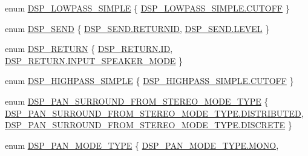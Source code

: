 \begin{DoxyCompactItemize}
enum \hyperlink{namespace_f_m_o_d_a346ac03fcdd5177ad38c9478df89c0dd}{D\+S\+P\+\_\+\+L\+O\+W\+P\+A\+S\+S\+\_\+\+S\+I\+M\+P\+LE} \{ \hyperlink{namespace_f_m_o_d_a346ac03fcdd5177ad38c9478df89c0dda87a6aa3278f5d7f6eadfdb8f66227a63}{D\+S\+P\+\_\+\+L\+O\+W\+P\+A\+S\+S\+\_\+\+S\+I\+M\+P\+L\+E.\+C\+U\+T\+O\+FF}
 \}
\item 
enum \hyperlink{namespace_f_m_o_d_a0d77bcf4c6e748a51c3ccfc32dee3200}{D\+S\+P\+\_\+\+S\+E\+ND} \{ \hyperlink{namespace_f_m_o_d_a0d77bcf4c6e748a51c3ccfc32dee3200adc385900d77d9fef6473cbb8a98e66a7}{D\+S\+P\+\_\+\+S\+E\+N\+D.\+R\+E\+T\+U\+R\+N\+ID}, 
\hyperlink{namespace_f_m_o_d_a0d77bcf4c6e748a51c3ccfc32dee3200aec46cfef93df98a48cda0c5df179485e}{D\+S\+P\+\_\+\+S\+E\+N\+D.\+L\+E\+V\+EL}
 \}
\item 
enum \hyperlink{namespace_f_m_o_d_ade37117086dbc5c6ef9556641e6b18e4}{D\+S\+P\+\_\+\+R\+E\+T\+U\+RN} \{ \hyperlink{namespace_f_m_o_d_ade37117086dbc5c6ef9556641e6b18e4ab718adec73e04ce3ec720dd11a06a308}{D\+S\+P\+\_\+\+R\+E\+T\+U\+R\+N.\+ID}, 
\hyperlink{namespace_f_m_o_d_ade37117086dbc5c6ef9556641e6b18e4a2e529d747873e4e8b12752b6401483ef}{D\+S\+P\+\_\+\+R\+E\+T\+U\+R\+N.\+I\+N\+P\+U\+T\+\_\+\+S\+P\+E\+A\+K\+E\+R\+\_\+\+M\+O\+DE}
 \}
\item 
enum \hyperlink{namespace_f_m_o_d_acec87c405b60a07feefe62825cfc820c}{D\+S\+P\+\_\+\+H\+I\+G\+H\+P\+A\+S\+S\+\_\+\+S\+I\+M\+P\+LE} \{ \hyperlink{namespace_f_m_o_d_acec87c405b60a07feefe62825cfc820ca87a6aa3278f5d7f6eadfdb8f66227a63}{D\+S\+P\+\_\+\+H\+I\+G\+H\+P\+A\+S\+S\+\_\+\+S\+I\+M\+P\+L\+E.\+C\+U\+T\+O\+FF}
 \}
\item 
enum \hyperlink{namespace_f_m_o_d_a95d3edb6cad93e38cd903cf3a525cc31}{D\+S\+P\+\_\+\+P\+A\+N\+\_\+\+S\+U\+R\+R\+O\+U\+N\+D\+\_\+\+F\+R\+O\+M\+\_\+\+S\+T\+E\+R\+E\+O\+\_\+\+M\+O\+D\+E\+\_\+\+T\+Y\+PE} \{ \hyperlink{namespace_f_m_o_d_a95d3edb6cad93e38cd903cf3a525cc31aabd866add2ca5a884a9ea8cc58e8ca73}{D\+S\+P\+\_\+\+P\+A\+N\+\_\+\+S\+U\+R\+R\+O\+U\+N\+D\+\_\+\+F\+R\+O\+M\+\_\+\+S\+T\+E\+R\+E\+O\+\_\+\+M\+O\+D\+E\+\_\+\+T\+Y\+P\+E.\+D\+I\+S\+T\+R\+I\+B\+U\+T\+ED}, 
\hyperlink{namespace_f_m_o_d_a95d3edb6cad93e38cd903cf3a525cc31a947436f2927405d3b5997a9ffbaee5c1}{D\+S\+P\+\_\+\+P\+A\+N\+\_\+\+S\+U\+R\+R\+O\+U\+N\+D\+\_\+\+F\+R\+O\+M\+\_\+\+S\+T\+E\+R\+E\+O\+\_\+\+M\+O\+D\+E\+\_\+\+T\+Y\+P\+E.\+D\+I\+S\+C\+R\+E\+TE}
 \}
\item 
enum \hyperlink{namespace_f_m_o_d_a87c9a310fe34aa45e053cfd0a21df38a}{D\+S\+P\+\_\+\+P\+A\+N\+\_\+\+M\+O\+D\+E\+\_\+\+T\+Y\+PE} \{ \hyperlink{namespace_f_m_o_d_a87c9a310fe34aa45e053cfd0a21df38aaf5f75f1b95652443e4398974b82c3f7c}{D\+S\+P\+\_\+\+P\+A\+N\+\_\+\+M\+O\+D\+E\+\_\+\+T\+Y\+P\+E.\+M\+O\+NO}, 

\end{DoxyCompactItemize}

